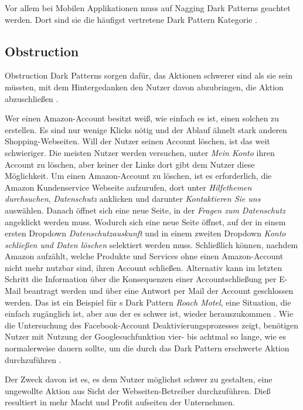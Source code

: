 \documentclass[conference,compsoc,final,a4paper]{IEEEtran}
\begin{document}
Vor allem bei Mobilen Applikationen muss auf Nagging Dark Patterns geachtet werden. Dort sind sie die häufigst vertretene Dark Pattern Kategorie \autocite{DiGeronimo2020}.

\subsection{Obstruction}
\label{chap:Obstruction}
Obstruction Dark Patterns sorgen dafür, das Aktionen schwerer sind als sie sein müssten, mit dem Hintergedanken den Nutzer davon abzubringen, die Aktion abzuschließen \autocite{Gray_2018}.

Wer einen Amazon-Account besitzt weiß, wie einfach es ist, einen solchen zu erstellen. Es sind nur wenige Klicks nötig und der Ablauf ähnelt stark anderen Shopping-Webseiten. Will der Nutzer seinen Account löschen, ist das weit schwieriger. Die meisten Nutzer werden versuchen, unter \textit{Mein Konto} ihren Account zu löschen, aber keiner der Links dort gibt dem Nutzer diese Möglichkeit. Um einen Amazon-Account zu löschen, ist es erforderlich, die Amazon Kundenservice Webseite aufzurufen, dort unter \textit{Hilfethemen durchsuchen}, \textit{Datenschutz} anklicken und darunter \textit{Kontaktieren Sie uns} auswählen. Danach öffnet sich eine neue Seite, in der \textit{Fragen zum Datenschutz} angeklickt werden muss. Wodurch sich eine neue Seite öffnet, auf der in einem ersten Dropdown \textit{Datenschutzauskunft} und in einem zweiten Dropdown \textit{Konto schließen und Daten löschen} selektiert werden muss. Schließlich können, nachdem Amazon aufzählt, welche Produkte und Services ohne einen Amazon-Account nicht mehr nutzbar sind, ihren Account schließen. Alternativ kann im letzten Schritt die Information über die Konsequenzen einer Accountschließung per E-Mail beantragt werden und über eine Antwort per Mail der Account geschlossen werden. Das ist ein Beispiel für \citeauthor{Brignull}s Dark Pattern \textit{Roach Motel}, eine Situation, die einfach zugänglich ist, aber aus der es schwer ist, wieder herauszukommen \autocite{Brignull}. Wie die Untersuchung des Facebook-Account Deaktivierungsprozesses zeigt, benötigen Nutzer mit Nutzung der Googlesuchfunktion vier- bis achtmal so lange, wie es normalerweise dauern sollte, um die durch das Dark Pattern erschwerte Aktion durchzuführen \autocite{M.Bhoot2020}.

Der Zweck davon ist es, es dem Nutzer möglichst schwer zu gestalten, eine ungewollte Aktion aus Sicht der Webseiten-Betreiber durchzuführen. Dieß resultiert in mehr Macht und Profit aufseiten der Unternehmen.
\end{document}
